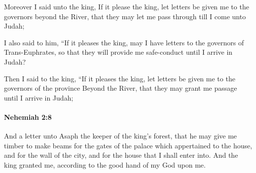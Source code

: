 			\begin{versebox}
					\item[BHS] 
					\item[LXX] 
					\item[ASV] Moreover I said unto the king, If it please the king, let letters be given me to the governors beyond the River, that they may let me pass through till I come unto Judah;
					\item[NIV] I also said to him, “If it pleases the king, may I have letters to the governors of Trans-Euphrates, so that they will provide me safe-conduct until I arrive in Judah?
					\item[NRSV] Then I said to the king, “If it pleases the king, let letters be given me to the governors of the province Beyond the River, that they may grant me passage until I arrive in Judah;
			\end{versebox}

		\paragraph{Nehemiah 2:8} %
			\label{NEHEMIAH-2-8}

			And a letter unto Asaph the keeper of the king’s forest, that he may give me timber to make beams for the gates of the palace which appertained to the house, and for the wall of the city, and for the house that I shall enter into. And the king granted me, according to the good hand of my God upon me.

